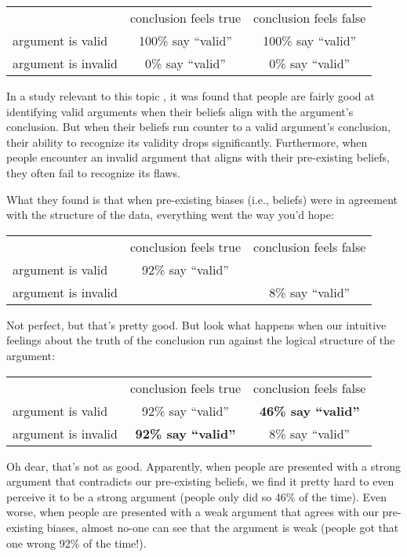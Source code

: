\begin{center}
\renewcommand{\arraystretch}{1.5}
\begin{tabular}{l|cc|}
\multicolumn{1}{c}{} & \multicolumn{1}{c}{conclusion feels true} & \multicolumn{1}{c}{conclusion feels false} \\ \cline{2-3}
argument is valid   & 100\% say ``valid'' & 100\%  say ``valid''\\ 
argument is invalid &  0\% say ``valid''& 0\% say ``valid''\\ \cline{2-3}
\end{tabular}
\end{center}

\noindent

In a study relevant to this topic  \parencite{Evans1983}, it was found that people are fairly good at identifying valid arguments when their beliefs align with the argument's conclusion. But when their beliefs run counter to a valid argument's conclusion, their ability to recognize its validity drops significantly. Furthermore, when people encounter an invalid argument that aligns with their pre-existing beliefs, they often fail to recognize its flaws.

What they found is that when pre-existing biases (i.e., beliefs) were in agreement with the structure of the data, everything went the way you'd hope: 
\begin{center}
\renewcommand{\arraystretch}{1.5}
\begin{tabular}{l|cc|}
\multicolumn{1}{c}{} & \multicolumn{1}{c}{conclusion feels true} & \multicolumn{1}{c}{conclusion feels false} \\ \cline{2-3}
argument is valid   & 92\% say ``valid''&  \\ 
argument is invalid &  & 8\% say ``valid''\\ \cline{2-3}
\end{tabular}
\end{center}
Not perfect, but that's pretty good. But look what happens when our intuitive feelings about the truth of the conclusion run against the logical structure of the argument:
\begin{center}
\renewcommand{\arraystretch}{1.5}
\begin{tabular}{l|cc|}
\multicolumn{1}{c}{} & \multicolumn{1}{c}{conclusion feels true} & \multicolumn{1}{c}{conclusion feels false} \\ \cline{2-3}
argument is valid   & 92\% say ``valid'' & {\bf 46\% say ``valid''} \\
argument is invalid & {\bf 92\% say ``valid''} & 8\% say ``valid'' \\ \cline{2-3}
\end{tabular}
\end{center}
Oh dear, that's not as good. Apparently, when people are presented with a strong argument that contradicts our pre-existing beliefs, we find it pretty hard to even perceive it to be a strong argument (people only did so 46\% of the time). Even worse, when people are presented with a weak argument that agrees with our pre-existing biases, almost no-one can see that the argument is weak (people got that one wrong 92\% of the time!).

